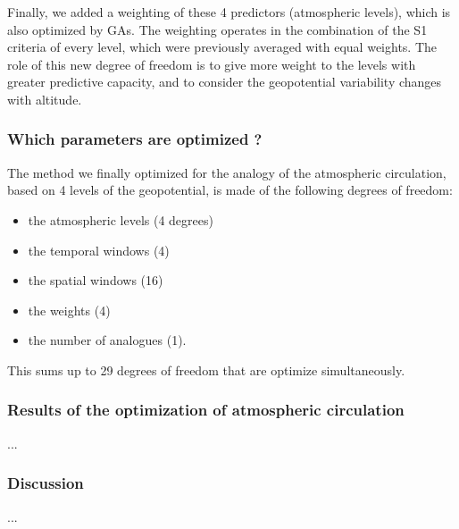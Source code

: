 \documentclass[twocol]{ametsoc}
\begin{document}
Finally, we added a weighting of these 4 predictors (atmospheric levels), which is also optimized by GAs. The weighting operates in the combination of the S1 criteria of every level, which were previously averaged with equal weights. The role of this new degree of freedom is to give more weight to the levels with greater predictive capacity, and to consider the geopotential variability changes with altitude. 


\subsubsection{Which parameters are optimized ?}

The method we finally optimized for the analogy of the atmospheric circulation, based on 4 levels of the geopotential, is made of the following degrees of freedom:

\begin{itemize}
	\setlength\itemsep{-4px}
	\item the atmospheric levels (4 degrees)
	\item the temporal windows (4)
	\item the spatial windows (16)
	\item the weights (4)
	\item the number of analogues (1).
\end{itemize}

This sums up to 29 degrees of freedom that are optimize simultaneously.

\subsubsection{Results of the optimization of atmospheric circulation}
...

\subsubsection{Discussion}
...


\end{document}
